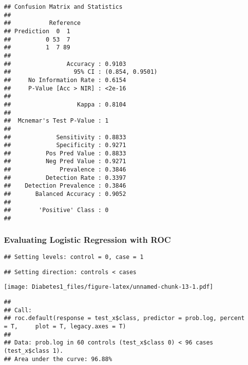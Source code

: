 \documentclass[
]{article}
\newenvironment{Shaded}{\begin{snugshade}}{\end{snugshade}}
\newcommand{\AttributeTok}[1]{\textcolor[rgb]{0.77,0.63,0.00}{#1}}
\newcommand{\FunctionTok}[1]{\textcolor[rgb]{0.00,0.00,0.00}{#1}}
\newcommand{\NormalTok}[1]{#1}
\newcommand{\SpecialCharTok}[1]{\textcolor[rgb]{0.00,0.00,0.00}{#1}}
\begin{document}
\begin{verbatim}
## Confusion Matrix and Statistics
## 
##           Reference
## Prediction  0  1
##          0 53  7
##          1  7 89
##                                          
##                Accuracy : 0.9103         
##                  95% CI : (0.854, 0.9501)
##     No Information Rate : 0.6154         
##     P-Value [Acc > NIR] : <2e-16         
##                                          
##                   Kappa : 0.8104         
##                                          
##  Mcnemar's Test P-Value : 1              
##                                          
##             Sensitivity : 0.8833         
##             Specificity : 0.9271         
##          Pos Pred Value : 0.8833         
##          Neg Pred Value : 0.9271         
##              Prevalence : 0.3846         
##          Detection Rate : 0.3397         
##    Detection Prevalence : 0.3846         
##       Balanced Accuracy : 0.9052         
##                                          
##        'Positive' Class : 0              
## 
\end{verbatim}

\hypertarget{evaluating-logistic-regression-with-roc}{%
\subsubsection{Evaluating Logistic Regression with
ROC}\label{evaluating-logistic-regression-with-roc}}

\begin{Shaded}
\end{Shaded}

\begin{verbatim}
## Setting levels: control = 0, case = 1
\end{verbatim}

\begin{verbatim}
## Setting direction: controls < cases
\end{verbatim}

\texttt{[image: Diabetes1\_files/figure-latex/unnamed-chunk-13-1.pdf]}

\begin{verbatim}
## 
## Call:
## roc.default(response = test_x$class, predictor = prob.log, percent = T,     plot = T, legacy.axes = T)
## 
## Data: prob.log in 60 controls (test_x$class 0) < 96 cases (test_x$class 1).
## Area under the curve: 96.88%
\end{verbatim}
\end{document}
